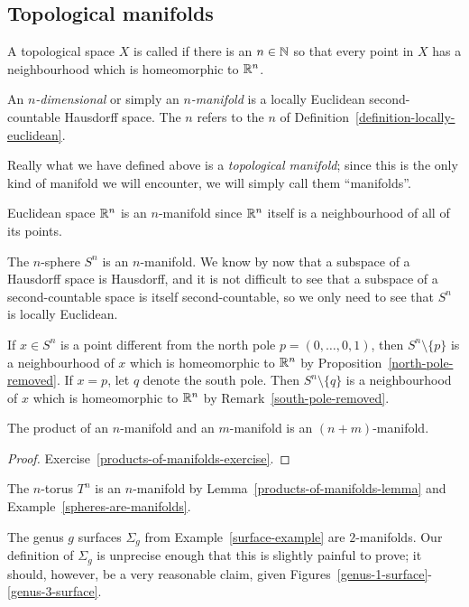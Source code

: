 \subsection{Topological manifolds}
\begin{defn}
  \label{definition-locally-euclidean}
  A topological space $X$ is called  if there is an $n \in \mathbb{N}$ so that every point in $X$ has a neighbourhood which is homeomorphic to $\mathbb{R}^n$.
\end{defn}
\begin{defn}
  An \emph{$n$-dimensional}  or simply an \emph{$n$-manifold} is a locally Euclidean second-countable Hausdorff space. The $n$ refers to the $n$ of Definition~\ref{definition-locally-euclidean}.
\end{defn}
Really what we have defined above is a \emph{topological manifold}; since this is the only kind of manifold we will encounter, we will simply call them ``manifolds''.
\begin{example}
  Euclidean space $\mathbb{R}^n$ is an $n$-manifold since $\mathbb{R}^n$ itself is a neighbourhood of all of its points.
\end{example}
\begin{example}
  \label{spheres-are-manifolds}
  The $n$-sphere $S^n$ is an $n$-manifold. We know by now that a subspace of a Hausdorff space is Hausdorff, and it is not difficult to see that a subspace of a second-countable space is itself second-countable, so we only need to see that $S^n$ is locally Euclidean.
  
  If $x \in S^n$ is a point different from the north pole $p = (0,\dots,0,1)$, then $S^n \setminus \{p\}$ is a neighbourhood of $x$ which is homeomorphic to $\mathbb{R}^n$ by Proposition~\ref{north-pole-removed}. If $x = p$, let $q$ denote the south pole. Then $S^n \setminus \{q\}$ is a neighbourhood of $x$ which is homeomorphic to $\mathbb{R}^n$ by Remark~\ref{south-pole-removed}.
\end{example}
\begin{lem}
  \label{products-of-manifolds-lemma}
  The product of an $n$-manifold and an $m$-manifold is an $(n+m)$-manifold.
\end{lem}
\begin{proof}
  Exercise~\ref{products-of-manifolds-exercise}.
\end{proof}
\begin{example}
  The $n$-torus $T^n$ is an $n$-manifold by Lemma~\ref{products-of-manifolds-lemma} and Example~\ref{spheres-are-manifolds}.
\end{example}
\begin{example}
  The genus $g$ surfaces $\Sigma_g$ from Example~\ref{surface-example} are $2$-manifolds. Our definition of $\Sigma_g$ is unprecise enough that this is slightly painful to prove; it should, however, be a very reasonable claim, given Figures~\ref{genus-1-surface}-\ref{genus-3-surface}.
\end{example}

